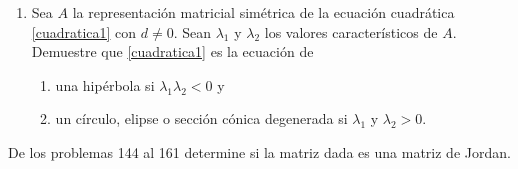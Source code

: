 \begin{enumerate}[start=143]
    \item Sea $A$ la representación matricial simétrica de la ecuación cuadrática \eqref{cuadratica1} con $d \neq 0$. Sean $\lambda_{1}$ y $\lambda_{2}$ los valores característicos de $A$. Demuestre que \eqref{cuadratica1} es la ecuación de
    \begin{enumerate}
        \item una hipérbola si $\lambda_{1} \lambda_{2}<0$ y
        \item un círculo, elipse o sección cónica degenerada si $\lambda_{1}$ y $\lambda_{2}>0$.
    \end{enumerate}
\end{enumerate}
De los problemas 144 al 161 determine si la matriz dada es una matriz de Jordan.
\begin{multienumerate}
    \setcounter{multienumi}{143}

\end{multienumerate}
